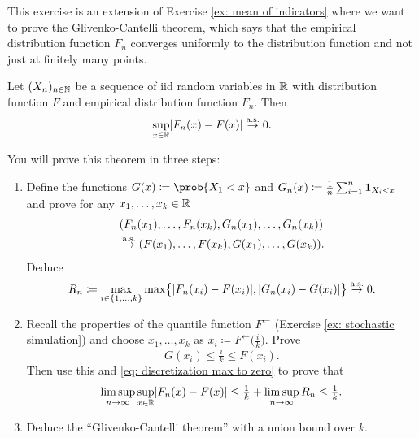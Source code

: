 
\begin{exercise}[subtitle={Glivenko-Cantelli theorem \Coffeecup\Coffeecup\Coffeecup}]
    This exercise is an extension of Exercise \ref{ex: mean of indicators} where
    we want to prove the Glivenko-Cantelli theorem, which says that the
    empirical distribution function \(F_n\) converges uniformly to the
    distribution function and not just at finitely many points.
    \begin{mdframed}[innertopmargin=0pt]
    \begin{theorem}
        \label{thm: glivenko cantelli}
        Let \((X_n)_{n\in \nat}\) be a sequence of iid random
        variables in \(\real\) with distribution function \(F\) and empirical 
        distribution function \(F_n\). Then
        \[
            \sup_{x\in \real}\abs{F_n(x) - F(x)} \overset{\as}\to 0.
        \]
    \end{theorem}
    \end{mdframed}
    You will prove this theorem in three steps:
    \begin{enumerate}[label=(\alph*),noitemsep]
        \item\label{it: glivenko cantelli discretization}
        Define the functions \(G(x) \coloneq \prob{X_1 < x}\) and \(G_n(x) \coloneq \frac1n \sum_{i=1}^n \ind{X_i < x}\)
        and prove for any \(x_1, \dots, x_k \in \real\)
        \[\begin{aligned}
            &(F_n(x_1), \dots, F_n(x_k), G_n(x_1), \dots, G_n(x_k))
            \\
            &\overset{\as}\to (F(x_1), \dots, F(x_k), G(x_1), \dots, G(x_k)).
        \end{aligned}
        \]
        Deduce
        \begin{equation}
            \label{eq: discretization max to zero}            
            R_n \coloneq \max_{i\in \set{1,\dots, k}} \max\set[\big]{\abs{F_n(x_i) - F(x_i)}, \abs{G_n(x_i) - G(x_i)}} \overset{\as}\to 0.
        \end{equation}

        \item\label{it: glivenko cantelli limsup bound} Recall the properties of the quantile function \(F^\leftarrow\) (Exercise \ref{ex: stochastic simulation})
        and choose \(x_1, \dots, x_k\) as \(x_i \coloneq F^\leftarrow\bigl(\frac{i}k\bigr)\).
        Prove
        \begin{equation}
            \label{eq: discretization properties}    
            G(x_i) \le \tfrac{i}k \le F(x_i).
        \end{equation}
        Then use this and \eqref{eq: discretization max to zero} to prove that
        \[
            \limsup_{n\to \infty} \sup_{x\in \real}\abs{F_n(x) - F(x)} \le \tfrac1k + \limsup_{n\to \infty}R_n \le \tfrac1k.
        \]

        \item\label{it: glivenko cantelli proof}
        Deduce the ``Glivenko-Cantelli theorem'' with a union bound over \(k\).
    \end{enumerate}
\end{exercise}

